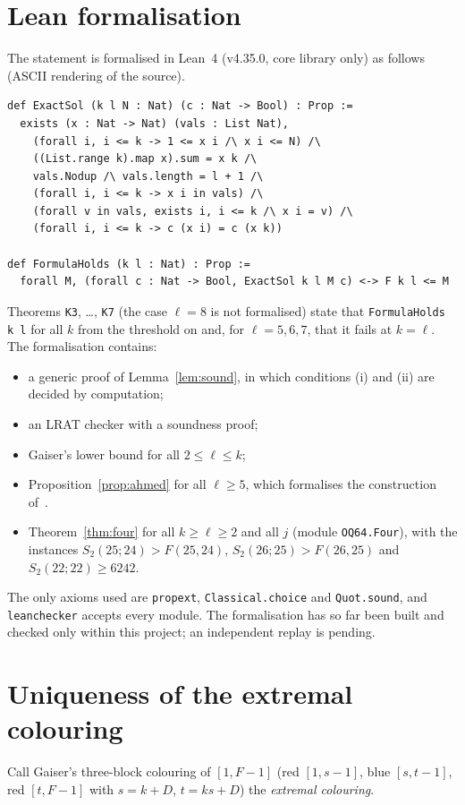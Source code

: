\documentclass[11pt]{amsart}
\theoremstyle{definition}
\newcommand{\F}{F}
\newcommand{\Stwo}{S_2}
\begin{document}
\section{Lean formalisation}\label{sec:lean}

The statement is formalised in Lean~4 (v4.35.0, core library only) as follows (ASCII rendering of the source).
\begin{verbatim}
def ExactSol (k l N : Nat) (c : Nat -> Bool) : Prop :=
  exists (x : Nat -> Nat) (vals : List Nat),
    (forall i, i <= k -> 1 <= x i /\ x i <= N) /\
    ((List.range k).map x).sum = x k /\
    vals.Nodup /\ vals.length = l + 1 /\
    (forall i, i <= k -> x i in vals) /\
    (forall v in vals, exists i, i <= k /\ x i = v) /\
    (forall i, i <= k -> c (x i) = c (x k))

def FormulaHolds (k l : Nat) : Prop :=
  forall M, (forall c : Nat -> Bool, ExactSol k l M c) <-> F k l <= M
\end{verbatim}
Theorems \texttt{K3}, \dots, \texttt{K7} (the case $\ell=8$ is not formalised) state that \texttt{FormulaHolds k l} for all $k$ from the threshold on and, for $\ell=5,6,7$, that it fails at $k=\ell$. The formalisation contains:
\begin{itemize}
\item a generic proof of Lemma~\ref{lem:sound}, in which conditions (i) and (ii) are decided by computation;
\item an LRAT checker with a soundness proof;
\item Gaiser's lower bound for all $2\le\ell\le k$;
\item Proposition~\ref{prop:ahmed} for all $\ell\ge5$, which formalises the construction of~\cite{ABRS}.
\item Theorem~\ref{thm:four} for all $k\ge\ell\ge2$ and all $j$ (module \texttt{OQ64.Four}), with the instances $\Stwo(25;24)>\F(25,24)$, $\Stwo(26;25)>\F(26,25)$ and $\Stwo(22;22)\ge6242$.
\end{itemize}
The only axioms used are \texttt{propext}, \texttt{Classical.choice} and \texttt{Quot.sound}, and \texttt{leanchecker} accepts every module. The formalisation has so far been built and checked only within this project; an independent replay is pending.

\section{Uniqueness of the extremal colouring}\label{sec:unique}

Call Gaiser's three-block colouring of $[1,\F-1]$ (red $[1,s-1]$, blue $[s,t-1]$, red $[t,\F-1]$ with $s=k+D$, $t=ks+D$) the \emph{extremal colouring}.
\end{document}
